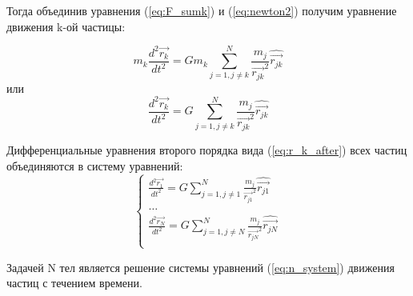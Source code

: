 Тогда объединив уравнения (\ref{eq:F_sumk}) и (\ref{eq:newton2}) получим уравнение движения k-ой частицы:
 
 \begin{equation}
 	\label{eq:r_k_before}
 	m_k\frac{d^2\vec{r_k}}{dt^2} = Gm_k\sum_{j=1, j \neq k}^{N}{\frac{m_j}{\vec{r_{jk}}^2}\hat{\vec{r_{jk}}}}
 \end{equation}
 или
 \begin{equation}
 	\label{eq:r_k_after}
 	\frac{d^2\vec{r_k}}{dt^2} = G\sum_{j=1, j \neq k}^{N}{\frac{m_j}{\vec{r_{jk}}^2}\hat{\vec{r_{jk}}}}
 \end{equation}
 
 Дифференциальные уравнения второго порядка вида (\ref{eq:r_k_after}) всех частиц объединяются в систему уравнений:
  \begin{equation}
 	\label{eq:n_system}
 	\begin{cases}
 		\frac{d^2\vec{r_1}}{dt^2} = G\sum_{j=1, j \neq 1}^{N}{\frac{m_j}{\vec{r_{j1}}^2}\hat{\vec{r_{j1}}}} \\
 		\dots \\
 		\frac{d^2\vec{r_N}}{dt^2} = G\sum_{j=1, j \neq N}^{N}{\frac{m_j}{\vec{r_{jN}}^2}\hat{\vec{r_{jN}}}} \\
 	\end{cases}
 \end{equation}

Задачей N тел является решение системы уравнений (\ref{eq:n_system}) движения частиц с течением времени.

